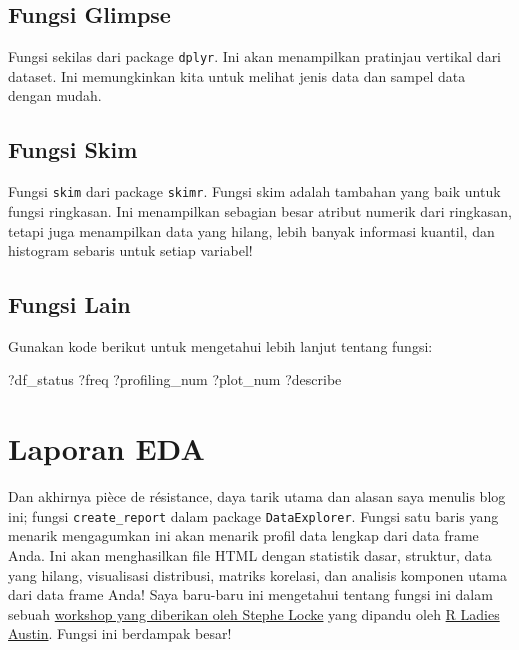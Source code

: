 \documentclass[
]{book}
\newenvironment{Shaded}{\begin{snugshade}}{\end{snugshade}}
\newcommand{\NormalTok}[1]{#1}
\begin{document}
\hypertarget{fungsi-glimpse}{%
\subsection{Fungsi Glimpse}\label{fungsi-glimpse}}

Fungsi sekilas dari package \texttt{dplyr}. Ini akan menampilkan pratinjau vertikal dari dataset. Ini memungkinkan kita untuk melihat jenis data dan sampel data dengan mudah.

\hypertarget{fungsi-skim}{%
\subsection{Fungsi Skim}\label{fungsi-skim}}

Fungsi \texttt{skim} dari package \texttt{skimr}. Fungsi skim adalah tambahan yang baik untuk fungsi ringkasan. Ini menampilkan sebagian besar atribut numerik dari ringkasan, tetapi juga menampilkan data yang hilang, lebih banyak informasi kuantil, dan histogram sebaris untuk setiap variabel!

\hypertarget{fungsi-lain}{%
\subsection{Fungsi Lain}\label{fungsi-lain}}

Gunakan kode berikut untuk mengetahui lebih lanjut tentang fungsi:

\begin{Shaded}
\begin{Highlighting}[]
\NormalTok{?df\_status}
\NormalTok{?freq}
\NormalTok{?profiling\_num}
\NormalTok{?plot\_num}
\NormalTok{?describe}
\end{Highlighting}
\end{Shaded}

\hypertarget{laporan-eda}{%
\section{Laporan EDA}\label{laporan-eda}}

Dan akhirnya pièce de résistance, daya tarik utama dan alasan saya menulis blog ini; fungsi \texttt{create\_report} dalam package \texttt{DataExplorer}. Fungsi satu baris yang menarik mengagumkan ini akan menarik profil data lengkap dari data frame Anda. Ini akan menghasilkan file HTML dengan statistik dasar, struktur, data yang hilang, visualisasi distribusi, matriks korelasi, dan analisis komponen utama dari data frame Anda! Saya baru-baru ini mengetahui tentang fungsi ini dalam sebuah \href{https://www.eventbrite.com/e/modern-r-for-data-science-workshop-w-steph-locke-tickets-50536282381\#}{workshop yang diberikan oleh Stephe Locke} yang dipandu oleh \href{https://www.meetup.com/rladies-austin/}{R Ladies Austin}. Fungsi ini berdampak besar!
\end{document}
